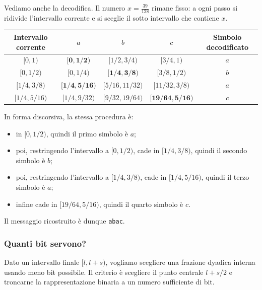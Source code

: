 \documentclass{article}
\theoremstyle{definition}
\numberwithin{equation}{section}
\begin{document}
Vediamo anche la decodifica. Il numero $x=\frac{39}{128}$ rimane fisso: a ogni passo si ridivide l'intervallo corrente e si sceglie il sotto intervallo che contiene $x$.
\begin{center}
    \begingroup
    \scriptsize
    \setlength{\tabcolsep}{2pt}
    \renewcommand{\arraystretch}{1.28}
    \begin{tabular}{|c|c|c|c|c|}
        \hline
        \textbf{Intervallo corrente} & \textbf{$a$}              & \textbf{$b$}             & \textbf{$c$}                & \textbf{Simbolo decodificato} \\ \hline
        $[0,1)$                      & $\boldsymbol{[0,1/2)}$    & $[1/2,3/4)$              & $[3/4,1)$                   & $a$                           \\ \hline
        $[0,1/2)$                    & $[0,1/4)$                 & $\boldsymbol{[1/4,3/8)}$ & $[3/8,1/2)$                 & $b$                           \\ \hline
        $[1/4,3/8)$                  & $\boldsymbol{[1/4,5/16)}$ & $[5/16,11/32)$           & $[11/32,3/8)$               & $a$                           \\ \hline
        $[1/4,5/16)$                 & $[1/4,9/32)$              & $[9/32,19/64)$           & $\boldsymbol{[19/64,5/16)}$ & $c$                           \\ \hline
    \end{tabular}
    \endgroup
\end{center}
In forma discorsiva, la stessa procedura è:
\begin{itemize}
    \item in $[0,1/2)$, quindi il primo simbolo è $a$;
    \item poi, restringendo l'intervallo a $[0,1/2)$, cade in $[1/4,3/8)$, quindi il secondo simbolo è $b$;
    \item poi, restringendo l'intervallo a $[1/4,3/8)$, cade in $[1/4,5/16)$, quindi il terzo simbolo è $a$;
    \item infine cade in $[19/64,5/16)$, quindi il quarto simbolo è $c$.
\end{itemize}
Il messaggio ricostruito è dunque \texttt{abac}.

\subsubsection{Quanti bit servono?}
Dato un intervallo finale $[l,l+s)$, vogliamo scegliere una frazione dyadica interna usando meno bit possibile. Il criterio è scegliere il punto centrale $l+s/2$ e troncarne la rappresentazione binaria a un numero sufficiente di bit.
\end{document}

